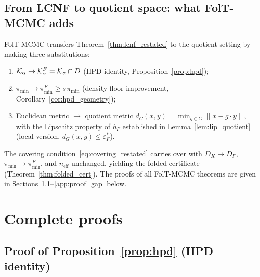 \subsection{From LCNF to quotient space: what FolT-MCMC adds}
\label{app:toolkit_folt}

FolT-MCMC transfers Theorem~\ref{thm:lcnf_restated} to the
quotient setting by making three substitutions:
\begin{enumerate}[nosep]
  \item $\mathcal{K}_\alpha \to \mathcal{K}_\alpha^F = \mathcal{K}_\alpha \cap D$
    (HPD identity, Proposition~\ref{prop:hpd});
  \item $\pi_{\min} \to \pi_{\min}^F \geq s\,\pi_{\min}$
    (density-floor improvement, Corollary~\ref{cor:hpd_geometry});
  \item Euclidean metric $\to$ quotient metric
    $d_G(x,y) = \min_{g \in G}\|x - g \cdot y\|$,
    with the Lipschitz property of $h_F$ established in
    Lemma~\ref{lem:lip_quotient} (local version,
    $d_G(x,y) \leq \varepsilon_F^*$).
\end{enumerate}
The covering condition~\eqref{eq:covering_restated} carries
over with $D_K \to D_F$, $\pi_{\min} \to \pi_{\min}^F$,
and $n_{\mathrm{eff}}$ unchanged, yielding the folded
certificate (Theorem~\ref{thm:folded_cert}).  The proofs
of all FolT-MCMC theorems are given in
Sections~\ref{app:proof_hpd}--\ref{app:proof_gap} below.


\section{Complete proofs}
\label{app:proofs}


\subsection{Proof of Proposition~\ref{prop:hpd} (HPD identity)}
\label{app:proof_hpd}

